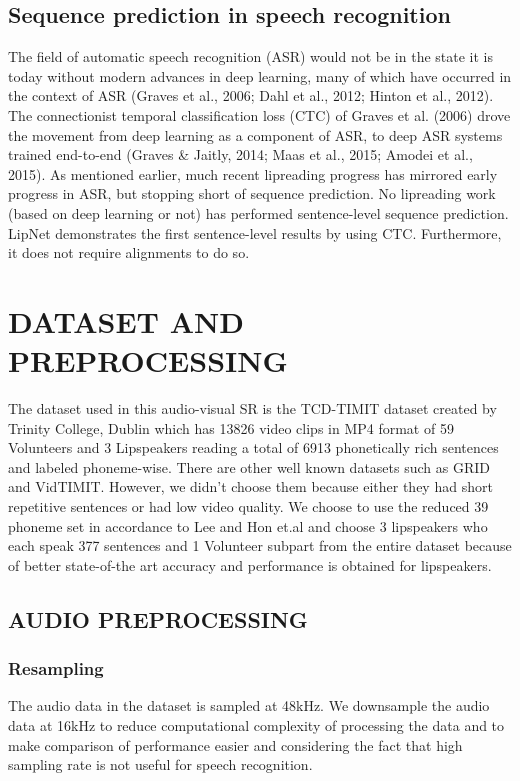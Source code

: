 \documentclass{article}
\begin{document}
\subsection{Sequence prediction in speech recognition}
The field of automatic speech recognition (ASR) would not be in the state it is today without modern advances in deep learning, many of which have occurred in the context of ASR (Graves et al., 2006; Dahl et al., 2012; Hinton et al., 2012). The connectionist temporal classification loss (CTC) of Graves et al. (2006) drove the movement from deep learning as a component of ASR, to deep ASR systems trained end-to-end (Graves \& Jaitly, 2014; Maas et al., 2015; Amodei et al., 2015). As mentioned earlier, much recent lipreading progress has mirrored early progress in ASR, but stopping short of sequence prediction. No lipreading work (based on deep learning or not) has performed sentence-level sequence prediction. LipNet demonstrates the first sentence-level results by using CTC. Furthermore, it does not require alignments to do so.


\section{DATASET AND PREPROCESSING}
The dataset used in this audio-visual SR is the TCD-TIMIT dataset created by Trinity College, Dublin which has 13826 video clips in MP4 format of 59 Volunteers and 3 Lipspeakers reading a total of 6913 phonetically rich sentences and labeled phoneme-wise. There are other well known datasets such as GRID and VidTIMIT. However, we didn't choose them because either they had short repetitive sentences or had low video quality. We choose to use the reduced 39 phoneme set in accordance to Lee and Hon et.al and choose 3 lipspeakers who each speak 377 sentences and 1 Volunteer sub\-part from the entire dataset because of better state-of-the art accuracy and performance is obtained for lipspeakers. 

\subsection{AUDIO PREPROCESSING}
\subsubsection{Resampling}
The audio data in the dataset is sampled at 48kHz. We downsample the audio data at 16kHz to reduce computational complexity of processing the data and to make comparison of performance easier and considering the fact that high sampling rate is not useful for speech recognition. 
\end{document}
